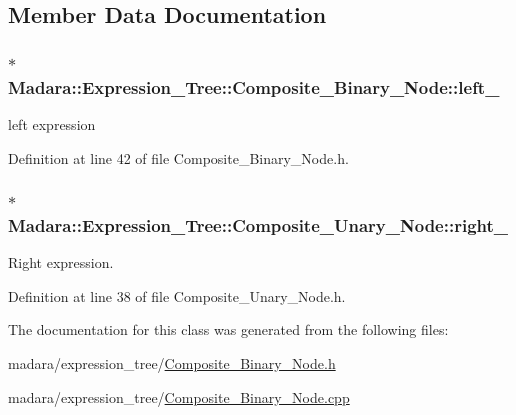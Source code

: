 \subsection{Member Data Documentation}
\hypertarget{classMadara_1_1Expression__Tree_1_1Composite__Binary__Node_acac60a70beb2484737e6e7161edb2d1b}{
\subsubsection[{left\_\-}]{$\ast$ {\bf Madara::Expression\_\-Tree::Composite\_\-Binary\_\-Node::left\_\-}}}
\label{df/d55/classMadara_1_1Expression__Tree_1_1Composite__Binary__Node_acac60a70beb2484737e6e7161edb2d1b}


left expression 



Definition at line 42 of file Composite\_\-Binary\_\-Node.h.

\hypertarget{classMadara_1_1Expression__Tree_1_1Composite__Unary__Node_a077b7bd1b52df6f5c6adfde735556a68}{
\subsubsection[{right\_\-}]{$\ast$ {\bf Madara::Expression\_\-Tree::Composite\_\-Unary\_\-Node::right\_\-}}}
\label{d3/dc7/classMadara_1_1Expression__Tree_1_1Composite__Unary__Node_a077b7bd1b52df6f5c6adfde735556a68}


Right expression. 



Definition at line 38 of file Composite\_\-Unary\_\-Node.h.



The documentation for this class was generated from the following files:\begin{DoxyCompactItemize}
\item 
madara/expression\_\-tree/\hyperlink{Composite__Binary__Node_8h}{Composite\_\-Binary\_\-Node.h}\item 
madara/expression\_\-tree/\hyperlink{Composite__Binary__Node_8cpp}{Composite\_\-Binary\_\-Node.cpp}\end{DoxyCompactItemize}
